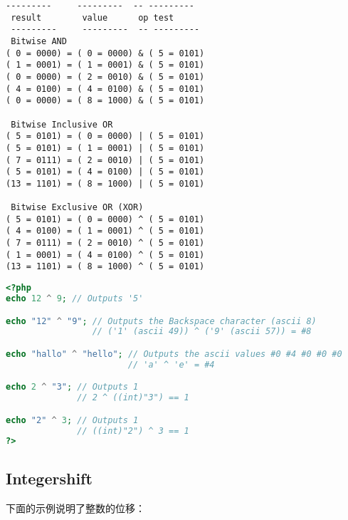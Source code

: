 \begin{verbatim}
---------     ---------  -- ---------
 result        value      op test
 ---------     ---------  -- ---------
 Bitwise AND
( 0 = 0000) = ( 0 = 0000) & ( 5 = 0101)
( 1 = 0001) = ( 1 = 0001) & ( 5 = 0101)
( 0 = 0000) = ( 2 = 0010) & ( 5 = 0101)
( 4 = 0100) = ( 4 = 0100) & ( 5 = 0101)
( 0 = 0000) = ( 8 = 1000) & ( 5 = 0101)

 Bitwise Inclusive OR
( 5 = 0101) = ( 0 = 0000) | ( 5 = 0101)
( 5 = 0101) = ( 1 = 0001) | ( 5 = 0101)
( 7 = 0111) = ( 2 = 0010) | ( 5 = 0101)
( 5 = 0101) = ( 4 = 0100) | ( 5 = 0101)
(13 = 1101) = ( 8 = 1000) | ( 5 = 0101)

 Bitwise Exclusive OR (XOR)
( 5 = 0101) = ( 0 = 0000) ^ ( 5 = 0101)
( 4 = 0100) = ( 1 = 0001) ^ ( 5 = 0101)
( 7 = 0111) = ( 2 = 0010) ^ ( 5 = 0101)
( 1 = 0001) = ( 4 = 0100) ^ ( 5 = 0101)
(13 = 1101) = ( 8 = 1000) ^ ( 5 = 0101)
\end{verbatim}


\begin{lstlisting}[language=PHP]
<?php
echo 12 ^ 9; // Outputs '5'

echo "12" ^ "9"; // Outputs the Backspace character (ascii 8)
                 // ('1' (ascii 49)) ^ ('9' (ascii 57)) = #8

echo "hallo" ^ "hello"; // Outputs the ascii values #0 #4 #0 #0 #0
                        // 'a' ^ 'e' = #4

echo 2 ^ "3"; // Outputs 1
              // 2 ^ ((int)"3") == 1

echo "2" ^ 3; // Outputs 1
              // ((int)"2") ^ 3 == 1
?>
\end{lstlisting}


\subsection{Integershift}



下面的示例说明了整数的位移：


